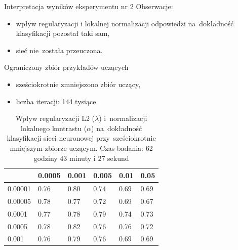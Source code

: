 \documentclass[xcolor=dvipsnames]{beamer}
\begin{document}
\begin{frame}{Interpretacja wyników eksperymentu nr 2}
    Obserwacje:
    \begin{itemize}
        \item wpływ regularyzacji i lokalnej normalizacji odpowiedzi na~dokładność klasyfikacji pozostał taki sam,
        \item sieć nie~została przeuczona.
    \end{itemize}
    \vspace{5mm}
\end{frame}
\begin{frame}{Ograniczony zbiór przykładów uczących}
    \begin{itemize}
        \item sześciokrotnie zmniejszono zbiór uczący,
        \item liczba iteracji: 144 tysiące.
    \end{itemize}
    \begin{table}[H]
        \centering
        \begin{tabular}{|l|l|l|l|l|l|}
            \hline
            \backslashbox{$\alpha$}{$\lambda$} & 0.0005 & 0.001 & 0.005 & 0.01 & 0.05 \\
            \hline
            0.00001 & 0.76 & 0.80 & 0.74 & 0.69 & 0.69 \\
            \hline
            0.00005 & 0.78 & 0.77 & 0.72 & 0.69 & 0.67 \\
            \hline
            0.0001  & 0.77 & 0.78 & 0.79 & 0.74 & 0.73 \\
            \hline
            0.0005  & 0.78 & 0.82 & 0.76 & 0.76 & 0.72 \\
            \hline
            0.001   & 0.76 & 0.79 & 0.76 & 0.69 & 0.69 \\
            \hline
        \end{tabular}
        \caption{Wpływ regularyzacji L2 ($\lambda$) i~normalizacji lokalnego kontrastu ($\alpha$) na~dokładność klasyfikacji
        sieci neuronowej przy~sześciokrotnie mniejszym zbiorze uczącym. Czas badania: 62 godziny 43 minuty i 27 sekund}
        \label{table:wyniki3}
    \end{table}
\end{frame}
\end{document}
